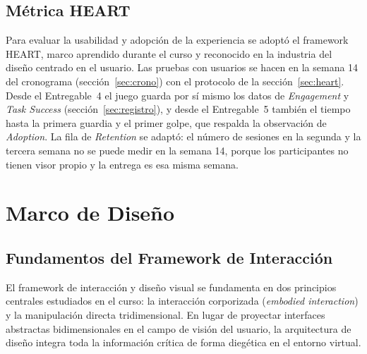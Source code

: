 \subsection{Métrica HEART}
Para evaluar la usabilidad y adopción de la experiencia se adoptó el framework HEART, marco aprendido durante el curso y reconocido en la industria del diseño centrado en el usuario. Las pruebas con usuarios se hacen en la semana 14 del cronograma (sección~\ref{sec:crono}) con el protocolo de la sección~\ref{sec:heart}. Desde el Entregable~4 el juego guarda por sí mismo los datos de \emph{Engagement} y \emph{Task Success} (sección~\ref{sec:registro}), y desde el Entregable~5 también el tiempo hasta la primera guardia y el primer golpe, que respalda la observación de \emph{Adoption}. La fila de \emph{Retention} se adaptó: el número de sesiones en la segunda y la tercera semana no se puede medir en la semana 14, porque los participantes no tienen visor propio y la entrega es esa misma semana.


\section{Marco de Diseño}
\label{sec:marco}
\subsection{Fundamentos del Framework de Interacción}
El framework de interacción y diseño visual se fundamenta en dos principios centrales estudiados en el curso: la interacción corporizada (\emph{embodied interaction}) y la manipulación directa tridimensional. En lugar de proyectar interfaces abstractas bidimensionales en el campo de visión del usuario, la arquitectura de diseño integra toda la información crítica de forma diegética en el entorno virtual.

